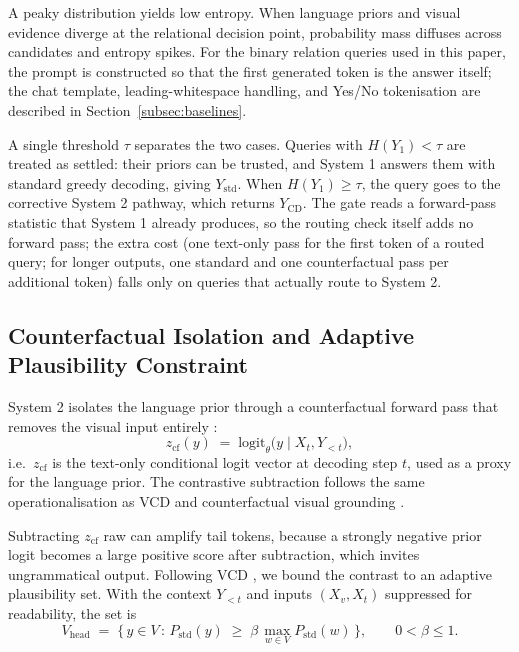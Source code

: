 \documentclass[pdflatex,sn-basic,Numbered]{sn-jnl}
\theoremstyle{thmstyleone}
\theoremstyle{thmstyletwo}
\theoremstyle{thmstylethree}
\begin{document}
A peaky distribution yields low entropy. When language priors and visual evidence diverge at the relational decision point, probability mass diffuses across candidates and entropy spikes. For the binary relation queries used in this paper, the prompt is constructed so that the first generated token is the answer itself; the chat template, leading-whitespace handling, and Yes/No tokenisation are described in Section~\ref{subsec:baselines}.

A single threshold $\tau$ separates the two cases. Queries with $H(Y_{1}) < \tau$ are treated as settled: their priors can be trusted, and System 1 answers them with standard greedy decoding, giving $Y_{\text{std}}$. When $H(Y_{1}) \geq \tau$, the query goes to the corrective System 2 pathway, which returns $Y_{\text{CD}}$. The gate reads a forward-pass statistic that System 1 already produces, so the routing check itself adds no forward pass; the extra cost (one text-only pass for the first token of a routed query; for longer outputs, one standard and one counterfactual pass per additional token) falls only on queries that actually route to System 2.

\subsection{Counterfactual Isolation and Adaptive Plausibility Constraint}\label{subsec:apc}

System 2 isolates the language prior through a counterfactual forward pass that removes the visual input entirely \cite{favero2024multi}:
\begin{equation}\label{eq:cf}
z_{\text{cf}}(y) \;=\; \text{logit}_{\theta}\bigl(y \mid X_{t}, Y_{<t}\bigr),
\end{equation}
i.e.\ $z_{\text{cf}}$ is the text-only conditional logit vector at decoding step $t$, used as a proxy for the language prior. The contrastive subtraction follows the same operationalisation as VCD \cite{leng2024mitigating} and counterfactual visual grounding \cite{favero2024multi}.

Subtracting $z_{\text{cf}}$ raw can amplify tail tokens, because a strongly negative prior logit becomes a large positive score after subtraction, which invites ungrammatical output. Following VCD \cite{leng2024mitigating}, we bound the contrast to an adaptive plausibility set. With the context $Y_{<t}$ and inputs $(X_{v}, X_{t})$ suppressed for readability, the set is
\begin{equation}\label{eq:head}
V_{\text{head}} \;=\; \bigl\{\, y \in V \,:\, P_{\text{std}}(y) \;\geq\; \beta\, \max_{w \in V} P_{\text{std}}(w)\,\bigr\}, \qquad 0 < \beta \leq 1.
\end{equation}
\end{document}
